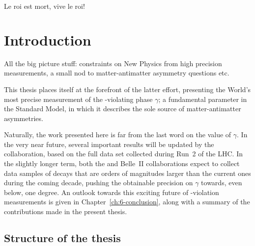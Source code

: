 \begin{savequote}[8cm]
Le roi est mort, vive le roi!
\end{savequote}

\chapter{\label{ch:1-intro}Introduction
} 



All the big picture stuff: constraints on New Physics from high precision measurements, a small nod to matter-antimatter asymmetry questions etc. 


This thesis places itself at the forefront of the latter effort, presenting the World's most precise measurement of the \CP-violating phase $\gamma$; a fundamental parameter in the Standard Model, in which it describes the sole source of matter-antimatter asymmetries. 



Naturally, the work presented here is far from the last word on the value of $\gamma$. In the very near future, several important results will be updated by the \lhcb collaboration, based on the full data set collected during Run~2 of the LHC. In the slightly longer term, both the \lhcb and Belle~II collaborations expect to collect data samples of \B decays that are orders of magnitudes larger than the current ones during the coming decade, pushing the obtainable precision on $\gamma$ towards, even below, one degree. An outlook towards this exciting future of \CP-violation measurements is given in Chapter~\ref{ch:6-conclusion}, along with a summary of the contributions made in the present thesis.

\section{Structure of the thesis} %
\label{sec:structure_of_the_thesis}

